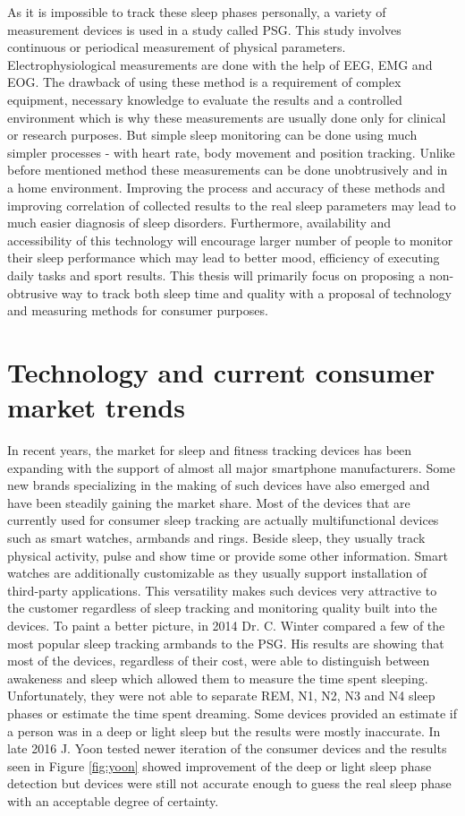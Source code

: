 As it is impossible to track these sleep phases personally, a variety of measurement devices is used in a study called \ac{PSG}. This study involves continuous or periodical measurement of physical parameters. Electrophysiological measurements are done with the help of \ac{EEG}, \ac{EMG} and \ac{EOG}. The drawback of using these method is a requirement of complex equipment, necessary knowledge to evaluate the results and a controlled environment which is why these measurements are usually done only for clinical or research purposes. But simple sleep monitoring can be done using much simpler processes - with heart rate, body movement and position tracking. Unlike before mentioned method these measurements can be done unobtrusively and in a home environment. Improving the process and accuracy of these methods and improving correlation of collected results to the real sleep parameters may lead to much easier diagnosis of sleep disorders. Furthermore, availability and accessibility of this technology will encourage larger number of people to monitor their sleep performance which may lead to better mood, efficiency of executing daily tasks and sport results. This thesis will primarily focus on proposing a non-obtrusive way to track both sleep time and quality with a proposal of technology and measuring methods for consumer purposes.


\section{Technology and current consumer market trends}

In recent years, the market for sleep and fitness tracking devices has been expanding with the support of almost all major smartphone manufacturers. Some new brands specializing in the making of such devices have also emerged and have been steadily gaining the market share. Most of the devices that are currently used for consumer sleep tracking are actually multifunctional devices such as smart watches, armbands and rings. Beside sleep, they usually track physical activity, pulse and show time or provide some other information. Smart watches are additionally customizable as they usually support installation of third-party applications. This versatility makes such devices very attractive to the customer regardless of sleep tracking and monitoring quality built into the devices. To paint a better picture, in 2014 Dr. C. Winter compared a few of the most popular sleep tracking armbands to the \ac{PSG}\cite{Winter}. His results are showing that most of the devices, regardless of their cost, were able to distinguish between awakeness and sleep which allowed them to measure the time spent sleeping. Unfortunately, they were not able to separate REM, N1, N2, N3 and N4 sleep phases or estimate the time spent dreaming. Some devices provided an estimate if a person was in a deep or light sleep but the results were mostly inaccurate. In late 2016 J. Yoon tested newer iteration of the consumer devices and the results seen in Figure \ref{fig:yoon} showed improvement of the deep or light sleep phase detection but devices were still not accurate enough to guess the real sleep phase with an acceptable degree of certainty\cite{Yoon}.


